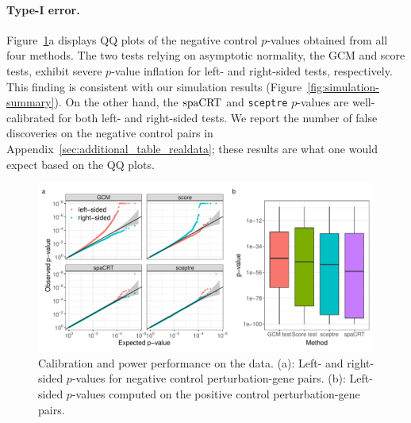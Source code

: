 \documentclass[12pt]{article}
\theoremstyle{definition}
\newcommand{\spacrt}{\textnormal{spaCRT}}               %
\begin{document}
  \paragraph{Type-I error.} Figure~\ref{fig:summary-real-data}a displays QQ plots of the negative control $p$-values obtained from all four methods. The two tests relying on asymptotic normality, the GCM and score tests, exhibit severe $p$-value inflation for left- and right-sided tests, respectively. This finding is consistent with our simulation results (Figure~\ref{fig:simulation-summary}). On the other hand, the $\spacrt$ and \verb|sceptre| $p$-values are well-calibrated for both left- and right-sided tests. We report the number of false discoveries on the negative control pairs in Appendix~\ref{sec:additional_table_realdata}; these results are what one would expect based on the QQ plots.
  \begin{figure}[!ht]
	  \centering
	  \includegraphics[width=1.0\textwidth]{figures-and-tables/real-data/combined_summary.pdf}
	  \caption{\small{Calibration and power performance on the \citet{Gasperini2019a} data. (a): Left- and right-sided $p$-values for negative control perturbation-gene pairs. (b): Left-sided $p$-values computed on the positive control perturbation-gene pairs.}}
	  \label{fig:summary-real-data}
  \end{figure}
  
\end{document}
